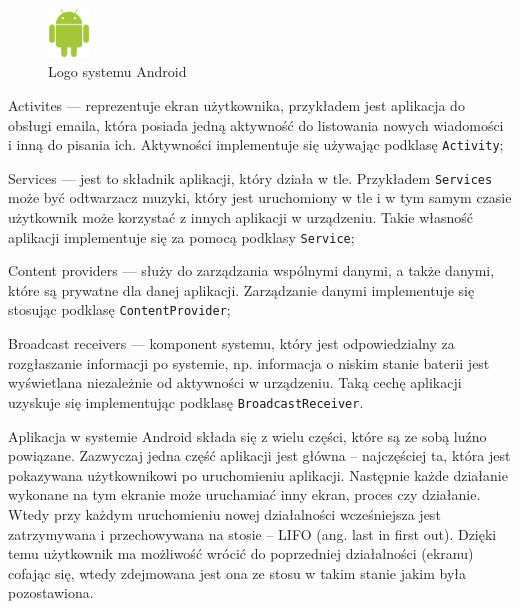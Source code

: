 \documentclass[eng,printmode,oneside]{mgr}
\begin{document}
\vspace{-2mm}
\begin{itemize}
  \item \parbox[t]{\dimexpr\textwidth-\leftmargin}{
     \vspace{-2.5mm}
    \begin{figure}
	\centering
	\includegraphics[width=0.1\textwidth]{andlogo.png}
	\caption{\label{fig:andlogo}Logo systemu Android \cite{developer.android}}
	\end{figure}
  Activites --- reprezentuje ekran użytkownika, przykładem jest aplikacja
  do obsługi emaila, która posiada jedną aktywność do listowania nowych
  wiadomości i inną do pisania ich. Aktywności implementuje się używając
  podklasę \texttt{Activity};
  \item Services --- jest to składnik aplikacji, który działa w tle. Przykładem
  \texttt{Services} może być odtwarzacz muzyki, który jest uruchomiony w tle i w
  tym samym czasie użytkownik może korzystać z innych aplikacji w urządzeniu.
  Takie własność aplikacji implementuje się za pomocą podklasy \texttt{Service};
	}
  \item Content providers --- służy do zarządzania wspólnymi danymi, a także
  danymi, które są prywatne dla danej aplikacji. Zarządzanie danymi
  implementuje się stosując podklasę \texttt{ContentProvider};
  \item Broadcast receivers --- komponent systemu, który jest
  odpowiedzialny za rozgłaszanie informacji po systemie, np. informacja o
  niskim stanie baterii jest wyświetlana niezależnie od aktywności w urządzeniu.
  Taką cechę aplikacji uzyskuje się implementując podklasę \texttt{BroadcastReceiver}.
\end{itemize}

Aplikacja w systemie Android składa się z wielu części, które są ze
sobą luźno powiązane. Zazwyczaj jedna część aplikacji jest główna -- najczęściej
ta, która jest pokazywana użytkownikowi po uruchomieniu aplikacji.
Następnie każde działanie wykonane na tym ekranie może uruchamiać inny ekran,
proces czy działanie. Wtedy przy każdym uruchomieniu nowej działalności
wcześniejsza jest zatrzymywana i przechowywana na stosie -- LIFO (ang. last in
first out). Dzięki temu użytkownik ma możliwość wrócić do poprzedniej
działalności (ekranu) cofając się, wtedy zdejmowana jest ona ze stosu w takim
stanie jakim była pozostawiona.
\end{document}
